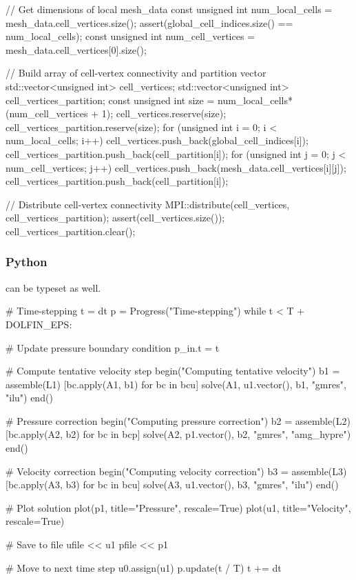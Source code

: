 \documentclass{ansarticle}
\begin{document}
\begin{c++}
// Get dimensions of local mesh_data
const unsigned int num_local_cells = mesh_data.cell_vertices.size();
assert(global_cell_indices.size() == num_local_cells);
const unsigned int num_cell_vertices = mesh_data.cell_vertices[0].size();

// Build array of cell-vertex connectivity and partition vector
std::vector<unsigned int> cell_vertices;
std::vector<unsigned int> cell_vertices_partition;
const unsigned int size = num_local_cells*(num_cell_vertices + 1);
cell_vertices.reserve(size);
cell_vertices_partition.reserve(size);
for (unsigned int i = 0; i < num_local_cells; i++)
{
  cell_vertices.push_back(global_cell_indices[i]);
  cell_vertices_partition.push_back(cell_partition[i]);
  for (unsigned int j = 0; j < num_cell_vertices; j++)
  {
    cell_vertices.push_back(mesh_data.cell_vertices[i][j]);
    cell_vertices_partition.push_back(cell_partition[i]);
  }
}

// Distribute cell-vertex connectivity
MPI::distribute(cell_vertices, cell_vertices_partition);
assert(cell_vertices.size());
cell_vertices_partition.clear();
\end{c++}

\subsubsection{Python}
can be typeset as well.

\begin{python}
# Time-stepping
t = dt
p = Progress("Time-stepping")
while t < T + DOLFIN_EPS:

    # Update pressure boundary condition
    p_in.t = t

    # Compute tentative velocity step
    begin("Computing tentative velocity")
    b1 = assemble(L1)
    [bc.apply(A1, b1) for bc in bcu]
    solve(A1, u1.vector(), b1, "gmres", "ilu")
    end()

    # Pressure correction
    begin("Computing pressure correction")
    b2 = assemble(L2)
    [bc.apply(A2, b2) for bc in bcp]
    solve(A2, p1.vector(), b2, "gmres", "amg_hypre")
    end()

    # Velocity correction
    begin("Computing velocity correction")
    b3 = assemble(L3)
    [bc.apply(A3, b3) for bc in bcu]
    solve(A3, u1.vector(), b3, "gmres", "ilu")
    end()

    # Plot solution
    plot(p1, title="Pressure", rescale=True)
    plot(u1, title="Velocity", rescale=True)

    # Save to file
    ufile << u1
    pfile << p1

    # Move to next time step
    u0.assign(u1)
    p.update(t / T)
    t += dt
\end{python}
\end{document}
